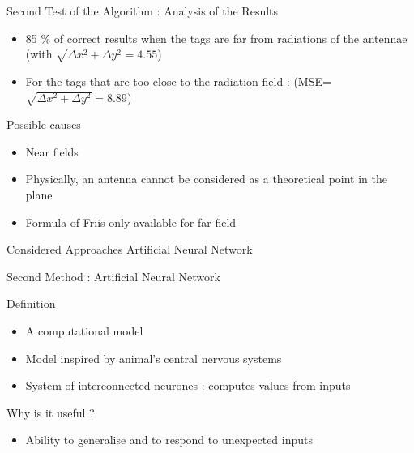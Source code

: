 \documentclass[utf8,compress]{beamer}
\begin{document}
\begin{frame}[containsverbatim]{Second Test of the Algorithm : Analysis of the Results }
\begin{itemize}
    \item 85 \% of correct results when the tags are far from radiations of the antennae
     (with $\sqrt{\Delta x^2 + \Delta y^2}= 4.55 $)
    \item For the tags that are too close to the radiation field :  
(MSE=$\sqrt{\Delta x^2 + \Delta y^2}= 8.89 $)
\end{itemize}
\begin{alertblock}{Possible causes}
\begin{itemize}
    \item  Near fields
    \item  Physically, an antenna cannot be considered as a theoretical point in the plane
    \item  Formula of Friis only available for far field
\end{itemize}
\end{alertblock}
\begin{exampleblock}{Considered Approaches}
 Artificial Neural Network
\end{exampleblock}
\end{frame}




\begin{frame}[containsverbatim]{Second Method : Artificial Neural Network}
\begin{block}{Definition}
\begin{itemize}
    \item A computational model
\vspace{0.4em} 
    \item Model inspired by animal's central nervous systems 
\vspace{0.4em} 
   \item  System of interconnected neurones : computes values from inputs
      \end{itemize}
\end{block}

\begin{block}{Why is it useful ? }
\begin{itemize}
    \item Ability to generalise and to respond to unexpected inputs
      \end{itemize}
\end{block}
\end{frame}
\end{document}
